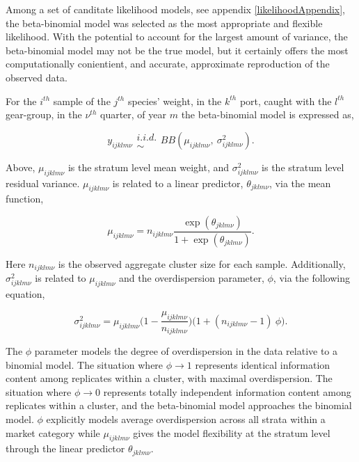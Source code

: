 \documentclass[12pt]{article}
\begin{document}
%
Among a set of canditate likelihood models, see {\color{red}appendix \ref{likelihoodAppendix}}, 
the beta-binomial model was selected as the most appropriate and flexible 
likelihood. With the potential to account for the largest amount of variance, 
the beta-binomial model may not be the true model, but it certainly offers the 
most computationally conientient, and accurate, approximate reproduction of 
the observed data. 


%
For the \(i^{th}\) sample of the \(j^{th}\) species' weight, in the \(k^{th}\) 
port, caught with the \(l^{th}\) gear-group, in the \(\nu^{th}\) quarter, of 
year \(m\) the beta-binomial model is expressed as, 

\begin{equation}
y_{ijklm\nu} \substack{i.i.d.\\\sim} BB(\mu_{ijklm\nu},~\sigma^2_{ijklm\nu}).
\end{equation}

Above, \(\mu_{ijklm\nu}\) is the stratum level mean weight, and 
\(\sigma^2_{ijklm\nu}\) is the stratum level residual variance.
\(\mu_{ijklm\nu}\) is related to a linear predictor,
\(\theta_{jklm\nu}\), via the mean function,

\begin{equation}
\mu_{ijklm\nu} = n_{ijklm\nu}\frac{\exp(\theta_{jklm\nu})}{1+\exp(\theta_{jklm\nu})}.
\end{equation}

Here \(n_{ijklm\nu}\) is the observed aggregate cluster size for each
sample. Additionally, \(\sigma^2_{ijklm\nu}\) is related to \(\mu_{ijklm\nu}\) 
and the overdispersion parameter, \(\phi\), via the following equation,

\begin{equation}
\sigma^2_{ijklm\nu} = \mu_{ijklm\nu}\Big(1-\frac{\mu_{ijklm\nu}}{n_{ijklm\nu}}\Big)\Big(1+(n_{ijklm\nu}-1)~\phi\Big).
\end{equation}

The \(\phi\) parameter models the degree of overdispersion in the data relative 
to a binomial model. The situation where \(\phi\rightarrow1\) 
represents identical information content among replicates within a cluster, 
with maximal overdispersion. The situation where \(\phi\rightarrow0\) 
represents totally independent information content among replicates within a 
cluster, and the beta-binomial model approaches the binomial model. \(\phi\) 
explicitly models average overdispersion across all strata within a market 
category while \(\mu_{ijklm\nu}\) gives the model flexibility at the stratum 
level through the linear predictor \(\theta_{jklm\nu}\). 
\end{document}
